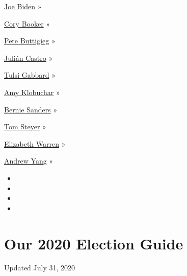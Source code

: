 \href{https://www.nytimes.com/interactive/2020/us/elections/joe-biden.html}{Joe
Biden} »

\href{https://www.nytimes.com/interactive/2020/us/elections/cory-booker.html}{Cory
Booker} »

\href{https://www.nytimes.com/interactive/2020/us/elections/pete-buttigieg.html}{Pete
Buttigieg} »

\href{https://www.nytimes.com/interactive/2020/us/elections/julian-castro.html}{Julián
Castro} »

\href{https://www.nytimes.com/interactive/2020/us/elections/tulsi-gabbard.html}{Tulsi
Gabbard} »

\href{https://www.nytimes.com/interactive/2020/us/elections/amy-klobuchar.html}{Amy
Klobuchar} »

\href{https://www.nytimes.com/interactive/2020/us/elections/bernie-sanders.html}{Bernie
Sanders} »

\href{https://www.nytimes.com/interactive/2020/us/elections/tom-steyer.html}{Tom
Steyer} »

\href{https://www.nytimes.com/interactive/2020/us/elections/elizabeth-warren.html}{Elizabeth
Warren} »

\href{https://www.nytimes.com/interactive/2020/us/elections/andrew-yang.html}{Andrew
Yang} »

\begin{itemize}
\item
\item
\item
\item
\end{itemize}

\hypertarget{our-2020-election-guide}{%
\section{Our 2020 Election Guide}\label{our-2020-election-guide}}

Updated July 31, 2020

